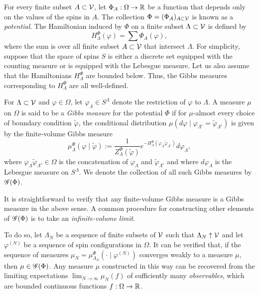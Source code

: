For every finite subset $A \subset \mathcal{V}$, let $\Phi_A : \Omega \rightarrow {\mathbb R}$ be a function that
depends only on the values of the spins in $A$. The collection $\Phi = (\Phi_A)_{A\subset\mathcal{V}}$
is known as a \emph{potential}. The Hamiltonian induced by $\Phi$ on a finite
subset $\Lambda \subset \mathcal{V}$ is defined by
\begin{equation}
H^\Phi_\Lambda(\varphi) = \sum \Phi_A(\varphi),
\end{equation}
where the sum is over all finite subset $A \subset \mathcal{V}$ that intersect $\Lambda$.
For simplicity, suppose that the space of spins $S$ is either a discrete set equipped with the
counting measure or is equipped with the Lebesgue measure. Let us also assume that the Hamiltonians
$H^\Phi_\Lambda$ are bounded below. Thus, the  Gibbs measures corresponding to $H^\Phi_\Lambda$ are
all well-defined.

For $\Lambda \subset \mathcal{V}$ and $\varphi \in \Omega$, let $\varphi_\Lambda \in S^\Lambda$
denote the restriction of $\varphi$ to $\Lambda$.
A measure $\mu$ on $\Omega$ is said to be a \emph{Gibbs measure} for the potential $\Phi$
if for $\mu$-almost
every choice of boundary condition $\tilde\varphi$, the conditional distribution
$\mu(d\varphi \mid \varphi_{\Lambda^c} = \tilde\varphi_{\Lambda^c})$ is given by the finite-volume Gibbs
measure
\begin{equation}
\mu^\Phi_\Lambda(\varphi \mid \tilde\varphi)
  :=
\frac{1}{Z^\Phi_\Lambda(\tilde\varphi)}
e^{-H^\Phi_\Lambda(\varphi_\Lambda \tilde\varphi_{\Lambda^c})}
d\varphi_\Lambda,
\end{equation}
where $\varphi_\Lambda\tilde\varphi_{\Lambda^c} \in \Omega$ is the concatenation of
$\varphi_\Lambda$ and $\tilde\varphi_{\Lambda^c}$
and where $d\varphi_\Lambda$ is the Lebesgue measure on $S^\Lambda$.
We denote the collection of all such Gibbs measures by $\mathscr{G}(\Phi)$.

It is straightforward to verify that any finite-volume Gibbs measure is a Gibbs measure
in the above sense. A common procedure for constructing other elements of $\mathscr{G}(\Phi)$
is to take an \emph{infinite-volume limit}.

To do so, let $\Lambda_N$ be a sequence of finite subsets of $\mathcal{V}$ such that
$\Lambda_N \uparrow \mathcal{V}$
and let $\varphi^{(N)}$ be a sequence of spin configurations in $\Omega$. It can be verified
that, if the sequence of measures $\mu_N = \mu^\Phi_{\Lambda_N}(\cdot \mid \varphi^{(N)})$ converges weakly
to a measure $\mu$, then $\mu\in\mathscr{G}(\Phi)$. Any measure $\mu$ constructed in this way
can be recovered from the limiting expectations $\lim_{N\to\infty} \mu_N(f)$ of sufficiently
many \emph{observables}, which are bounded continuous functions $f : \Omega \rightarrow {\mathbb R}$.


